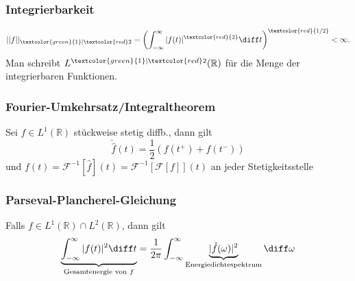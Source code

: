\begin{sectionbox}
    \subsubsection{\textcolor{green}{}\textbar\textcolor{red}{} Integrierbarkeit}
    \begin{equation*}
        ||f||_{\textcolor{green}{1}\vert\textcolor{red}2}=\left(\int_{-\infty}^{\infty}|f(t)|^{\textcolor{red}{2}}\diff t\right)^{\textcolor{red}{1/2}} < \infty.
    \end{equation*}
    Man schreibt $L^{\textcolor{green}{1}\vert\textcolor{red}2}(\mathbb R)$ für die Menge der \textcolor{green}{}\textbar\textcolor{red}{} integrierbaren Funktionen.
\end{sectionbox}

\begin{sectionbox}
    \subsubsection{Fourier-Umkehrsatz/Integraltheorem}
    Sei $f\in L^1(\mathbb R)$ stückweise stetig diffb., dann gilt \begin{equation*}
        \check{\hat f}(t) = \frac{1}{2}(f(t^+) + f(t^-))
    \end{equation*} und $f(t) = \mathcal F^{-1}[\hat f](t)=\mathcal F^{-1}[\mathcal F [f]](t)$ an jeder Stetigkeitsstelle
\end{sectionbox}

\begin{sectionbox}
    \subsubsection{Parseval-Plancherel-Gleichung}
    Falls $f\in L^1(\mathbb R) \cap L^2(\mathbb R)$, dann gilt
    \begin{equation*}
        \underbrace{\int_{-\infty}^{\infty}|f(t)|^2\diff t}_{\text{Gesamtenergie von } f} = \frac{1}{2\pi}\int_{-\infty}^{\infty}\underbrace{|\hat f(\omega)|^2}_{\text{Energiedichtespektrum}} \diff \omega
    \end{equation*}
\end{sectionbox}

